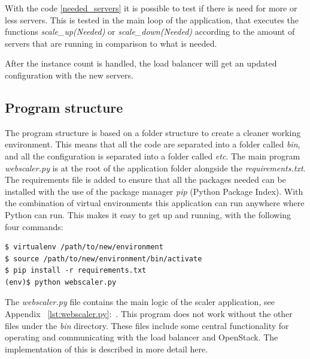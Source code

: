 With the code \ref{needed_servers} it is possible to test if there is need for
more or less servers. This is tested in the main loop of the application, that
executes the functions \textit{scale\_up(Needed)} or
\textit{scale\_down(Needed)} according to the amount of
servers that are running in comparison to what is needed.

After the instance count is handled, the load balancer will get an updated
configuration with the new servers.


\subsection{Program structure}
\begin{minipage}[t]{0.7\textwidth}
The program structure is based on a folder structure to create a cleaner
working environment. This means that all the code are separated into a folder
called \textit{bin}, and all the configuration is separated into a folder
called \textit{etc}. The main program \textit{webscaler.py} is at the root of
the application folder alongside the \textit{requirements.txt}. The
requirements file is added to ensure that all the packages needed can be
installed with the use of the package manager \textit{pip} (Python Package
Index). With the combination of virtual environments this application can run
anywhere where Python can run.
This makes it easy to get up and running, with the following four commands:
\begin{Verbatim}[frame=none]
$ virtualenv /path/to/new/environment
$ source /path/to/new/environment/bin/activate
$ pip install -r requirements.txt
(env)$ python webscaler.py
\end{Verbatim}

\end{minipage}
\begin{minipage}[t]{0.3\textwidth}
\end{minipage}
The \textit{webscaler.py} file contains the main logic of the scaler
application, see Appendix
~\ref{lst:webscaler.py}:~. This program does not work
without the other files under the \textit{bin} directory. These files include
some central functionality for operating and communicating with the load
balancer and OpenStack. The implementation of this is described in more detail
here.

